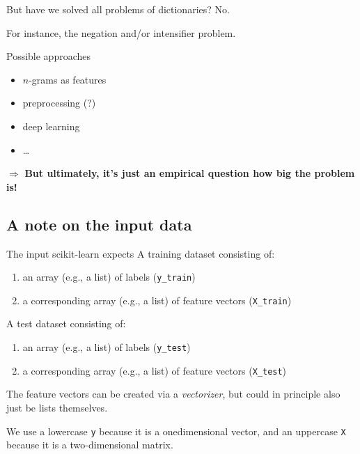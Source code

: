 \documentclass[compress]{beamer}
\begin{document}
\begin{frame}{But have we solved all problems of dictionaries?}
	No.
	
	For instance, the negation and/or intensifier problem.
	
	Possible approaches
	\begin{itemize}
		\item $n$-grams as features
		\item preprocessing (?)
		\item deep learning 
		\item \ldots
	\end{itemize}
	\pause
	
	$\Rightarrow$ \textbf{But ultimately, it's just an empirical question how big the problem is!}
	
	
\end{frame}


\subsection{A note on the input data}

\begin{frame}{The input scikit-learn expects}
	A training dataset consisting of:
	\begin{enumerate}
		\item an array (e.g., a list) of labels (\texttt{y\_train})
		\item a corresponding array (e.g., a list) of feature vectors (\texttt{X\_train})
	\end{enumerate}
	
	A test dataset consisting of:
	\begin{enumerate}
		\item an array (e.g., a list) of labels (\texttt{y\_test})
		\item a corresponding array (e.g., a list) of feature vectors (\texttt{X\_test})
	\end{enumerate}
	
	The feature vectors can be created via a \textit{vectorizer}, but could in principle also just be lists themselves.
	
	We use a lowercase \texttt{y} because it is a onedimensional vector, and an uppercase \texttt{X} because it is a two-dimensional matrix.
\end{frame}
\end{document}
